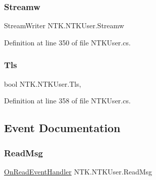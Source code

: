 \mbox{\label{class_n_t_k_1_1_n_t_k_user_aae5bebb581da61cad128700d2c1d906f}} 
\subsubsection{\texorpdfstring{Streamw}{Streamw}}
{\footnotesize\ttfamily Stream\+Writer N\+T\+K.\+N\+T\+K\+User.\+Streamw\hspace{0.3cm}{\ttfamily [get]}}







Definition at line 350 of file N\+T\+K\+User.\+cs.

\mbox{\label{class_n_t_k_1_1_n_t_k_user_a15f289c4a8ba6b294999f383ae93da8d}} 
\subsubsection{\texorpdfstring{Tls}{Tls}}
{\footnotesize\ttfamily bool N\+T\+K.\+N\+T\+K\+User.\+Tls\hspace{0.3cm}{\ttfamily [get]}, {\ttfamily [set]}}







Definition at line 358 of file N\+T\+K\+User.\+cs.



\subsection{Event Documentation}
\mbox{\label{class_n_t_k_1_1_n_t_k_user_aaa37fc7deec4103a88b7a294a7d7bac0}} 
\subsubsection{\texorpdfstring{ReadMsg}{ReadMsg}}
{\footnotesize\ttfamily \mbox{\hyperlink{namespace_n_t_k_a9fd65121d09e11207741ba8765106f70}{On\+Read\+Event\+Handler}} N\+T\+K.\+N\+T\+K\+User.\+Read\+Msg}







